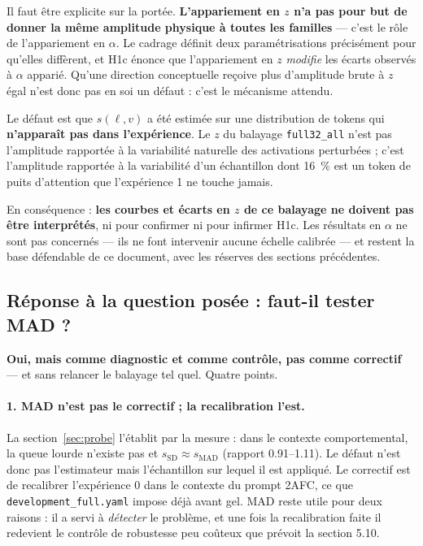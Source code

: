 \documentclass[11pt,a4paper]{article}
\newcommand{\ssd}{s_{\mathrm{SD}}}
\newcommand{\smad}{s_{\mathrm{MAD}}}
\newcommand{\code}[1]{\texttt{\small #1}}
\begin{document}
Il faut être explicite sur la portée. \textbf{L'appariement en $z$ n'a pas pour but de
donner la même amplitude physique à toutes les familles} --- c'est le rôle de
l'appariement en $\alpha$. Le cadrage définit deux paramétrisations précisément pour
qu'elles diffèrent, et H1c énonce que l'appariement en $z$ \emph{modifie} les écarts
observés à $\alpha$ apparié. Qu'une direction conceptuelle reçoive plus d'amplitude brute
à $z$ égal n'est donc pas en soi un défaut : c'est le mécanisme attendu.

Le défaut est que $s(\ell,v)$ a été estimée sur une distribution de tokens qui
\textbf{n'apparaît pas dans l'expérience}. Le $z$ du balayage \code{full32\_all} n'est pas
\og l'amplitude rapportée à la variabilité naturelle des activations perturbées \fg{} ;
c'est l'amplitude rapportée à la variabilité d'un échantillon dont \SI{16}{\percent} est
un token de puits d'attention que l'expérience 1 ne touche jamais.

En conséquence : \textbf{les courbes et écarts en $z$ de ce balayage ne doivent pas être
interprétés}, ni pour confirmer ni pour infirmer H1c. Les résultats en $\alpha$ ne sont
pas concernés --- ils ne font intervenir aucune échelle calibrée --- et restent la base
défendable de ce document, avec les réserves des sections précédentes.

\subsection{Réponse à la question posée : faut-il tester MAD ?}

\textbf{Oui, mais comme diagnostic et comme contrôle, pas comme correctif} --- et sans
relancer le balayage tel quel. Quatre points.

\paragraph{1. MAD n'est pas le correctif ; la recalibration l'est.} La
section~\ref{sec:probe} l'établit par la mesure : dans le contexte comportemental, la
queue lourde n'existe pas et $\ssd \approx \smad$ (rapport \num{0.91}--\num{1.11}). Le
défaut n'est donc pas l'estimateur mais l'échantillon sur lequel il est appliqué. Le
correctif est de recalibrer l'expérience 0 dans le contexte du prompt 2AFC, ce que
\code{development\_full.yaml} impose déjà avant gel. MAD reste utile pour deux raisons :
il a servi à \emph{détecter} le problème, et une fois la recalibration faite il redevient
le contrôle de robustesse peu coûteux que prévoit la section 5.10.
\end{document}
